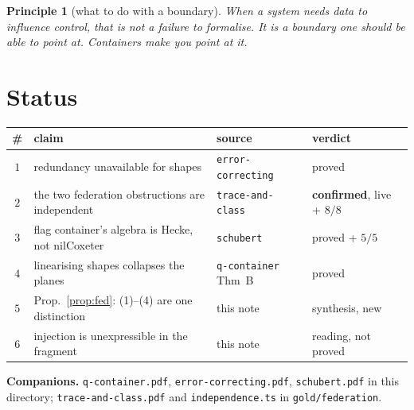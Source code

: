\documentclass[11pt,a4paper]{article}
\newtheorem{principle}[theorem]{Principle}
\theoremstyle{definition}
\theoremstyle{remark}
\newcommand{\OK}{\textcolor{okgreen}{\textbf{confirmed}}}
\begin{document}
\begin{principle}[what to do with a boundary]
When a system needs data to influence control, that is not a failure to
formalise. It is a boundary one should be able to point at. Containers make you
point at it.
\end{principle}

\section{Status}

\begin{center}
\small
\setlength{\tabcolsep}{4pt}
\begin{tabular}{cp{}ll}
\toprule
\# & claim & source & verdict \\
\midrule
$1$ & redundancy unavailable for shapes & \texttt{error-correcting} & proved \\
$2$ & the two federation obstructions are independent & \texttt{trace-and-class} & \OK{}, live + $8/8$ \\
$3$ & flag container's algebra is Hecke, not nilCoxeter & \texttt{schubert} & proved + $5/5$ \\
$4$ & linearising shapes collapses the planes & \texttt{q-container} Thm~B & proved \\
$5$ & Prop.~\ref{prop:fed}: (1)--(4) are one distinction & this note & synthesis, new \\
$6$ & injection is unexpressible in the fragment & this note & reading, not proved \\
\bottomrule
\end{tabular}
\end{center}

\noindent\textbf{Companions.} \texttt{q-container.pdf},
\texttt{error-correcting.pdf}, \texttt{schubert.pdf} in this directory;
\texttt{trace-and-class.pdf} and \texttt{independence.ts} in
\texttt{gold/federation}.
\end{document}
